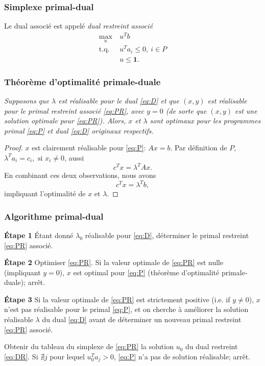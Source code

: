 \documentclass[t,usepdftitle=false]{beamer}
\def\bone{\boldsymbol{1}}
\begin{document}
\begin{frame}
\frametitle{Simplexe primal-dual}

Le dual associé est appelé {\sl dual restreint associé}
\begin{equation}
	\tag{DR}
	\label{eq:DR}
\begin{aligned}
\max_u\ & u^T b\\
\mbox{t.q. } & u^T a_i \leq 0,\ i \in P\\
& u \leq \bone.
\end{aligned}
\end{equation}

\end{frame}

\begin{frame}
\frametitle{Théorème d'optimalité primale-duale}

{\sl Supposons que $\lambda$ est réalisable pour le dual \eqref{eq:D} et que $(x,y)$ est réalisable pour le primal restreint associé \eqref{eq:PR}, avec $y = 0$ (de sorte que $(x,y)$ est une solution optimale pour \eqref{eq:PR}). Alors, $x$ et $\lambda$ sont optimaux pour les programmes primal \eqref{eq:P} et dual \eqref{eq:D} originaux respectifs.}

\begin{proof}
$x$ est clairement réalisable pour \eqref{eq:P}: $Ax = b$.
Par définition de $P$, $\lambda^T a_i = c_i,\mbox{ si } x_i \ne 0$,
aussi
$$
c^T x = \lambda^T Ax.
$$
En combinant ces deux observations, nous avons
\[
c^T x = \lambda^T b,
\]
impliquant l'optimalité de $x$ et $\lambda$.
\end{proof}

\end{frame}

\begin{frame}
\frametitle{Algorithme primal-dual}

{\bf Étape 1}
Étant donné $\lambda_0$ réalisable pour \eqref{eq:D}, déterminer le primal restreint \eqref{eq:PR} associé.

\mbox{}

{\bf Étape 2}
Optimiser \eqref{eq:PR}.
Si la valeur optimale de \eqref{eq:PR} est nulle (impliquant $y = 0$), $x$ est optimal pour \eqref{eq:P} (théorème d'optimalité primale-duale); arrêt.


\mbox{}

{\bf Étape 3}
Si la valeur optimale de \eqref{eq:PR} est strictement positive
(i.e. if $y \ne 0$), $x$ n'est pas réalisable pour le primal \eqref{eq:P}, et on cherche à améliorer la solution réalisable $\lambda$ du dual \eqref{eq:D} avant de déterminer un nouveau primal restreint \eqref{eq:PR} associé.

Obtenir du tableau du simplexe de  \eqref{eq:PR} la solution $u_0$ du dual restreint  \eqref{eq:DR}.
Si $\nexists j$ pour lequel $u_0^T a_j > 0$, \eqref{eq:P} n'a pas de solution réalisable; arrêt.
\end{frame}
\end{document}
